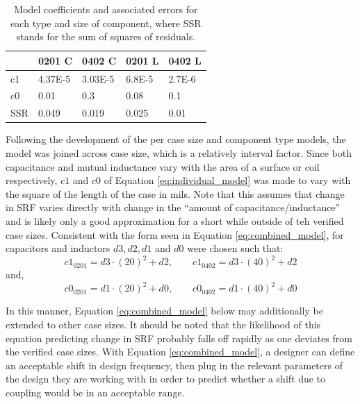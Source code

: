 \documentclass[12pt]{usfcoe}
\begin{document}
    \begin{table}[H]
        \begin{center}
            \begin{tabular}{|l|l|l|l|l| }
            \hline
            & 0201 C & 0402 C & 0201 L & 0402 L\\
            \hline
             c1 & 4.37E-5 & 3.03E-5 & 6.8E-5 & 2.7E-6\\
            \hline
            c0 & 0.01 & 0.3 & 0.08 & 0.1  \\
            \hline
            SSR & 0.049 & 0.019 & 0.025 & 0.01\\
            \hline
            \end{tabular}
            \label{tbl:individual_model_coeffs}
        	\caption{Model coefficients and associated errors for each type and size of component, where SSR stands for the sum of squares of residuals. }
        \end{center}
	\end{table}   
	
	Following the development of the per case size and component type models, the model was joined across case size, which is a relatively interval factor. 
	Since both capacitance and mutual inductance vary with the area of a surface or coil respectively, $c1$ and $c0$ of Equation \ref{eq:individual_model} was made to vary with the square of the length of the case in mils. 
	Note that this assumes that change in SRF varies directly with change in the ``amount of capacitance/inductance'' and is likely only a good approximation for a short while outside of teh verified case sizes.
	Consistent with the form seen in Equation \ref{eq:combined_model}, for capacitors and inductors $d3, d2, d1$ and $d0$ were chosen such that:
    \begin{equation*}
	c1_{0201} = d3 \cdot (20)^2 +d2, \qquad  c1_{0402} = d3 \cdot (40)^2 +d2 
    \end{equation*}
	and,  
    \begin{equation*}
    c0_{0201} = d1 \cdot (20)^2 +d0, \qquad  c0_{0402} = d1 \cdot (40)^2 +d0
    \end{equation*}
	
	In this manner, Equation \ref{eq:combined_model} below may additionally be extended to other case sizes. 
	It should be noted that the likelihood of this equation predicting change in SRF probably falls off rapidly as one deviates from the verified case sizes. 
	With Equation \ref{eq:combined_model}, a designer can define an acceptable shift in design frequency, then plug in the relevant parameters of the design they are working with in order to predict whether a shift due to coupling would be in an acceptable range.
	
\end{document}
